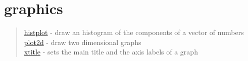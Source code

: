 \chapter*{graphics}

\begin{quote}
\noindent
\hyperlink{histplot}{histplot} - draw an histogram of the components of a vector of numbers\\
\hyperlink{plot2d}{plot2d} - draw two dimensional graphs\\
\hyperlink{xtitle}{xtitle} - sets the main title and the axis labels
of a graph\\
\end{quote}




